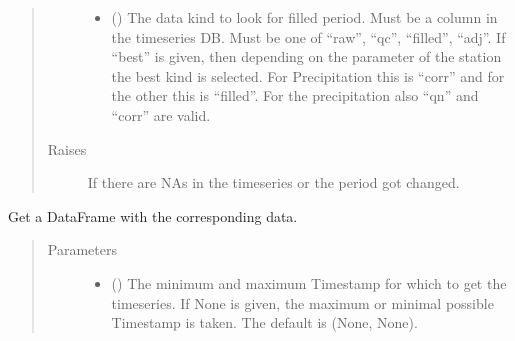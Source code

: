 \documentclass[letterpaper,10pt,english]{sphinxmanual}
\begin{document}
\begin{fulllineitems}
\begin{fulllineitems}
\begin{quote}
\begin{description}
\begin{itemize}
\item {} 
\sphinxAtStartPar
{} () \textendash{} The data kind to look for filled period.
Must be a column in the timeseries DB.
Must be one of “raw”, “qc”, “filled”, “adj”.
If “best” is given, then depending on the parameter of the station the best kind is selected.
For Precipitation this is “corr” and for the other this is “filled”.
For the precipitation also “qn” and “corr” are valid.

\end{itemize}

\item[{Raises}] \leavevmode
\sphinxAtStartPar
{} \textendash{} If there are NAs in the timeseries or the period got changed.

\end{description}\end{quote}

\end{fulllineitems}


\begin{fulllineitems}
\label{\detokenize{weatherDB:weatherDB.station.GroupStation.get_df}}
\sphinxAtStartPar
Get a DataFrame with the corresponding data.
\begin{quote}\begin{description}
\item[{Parameters}] \leavevmode\begin{itemize}
\item {} 
\sphinxAtStartPar
{} ({\hyperref[\detokenize{weatherDB.lib:weatherDB.lib.utils.TimestampPeriod}]{}}\sphinxstyleliteralemphasis{\sphinxupquote{(}}\sphinxstyleliteralemphasis{\sphinxupquote{)}}\sphinxstyleliteralemphasis{\sphinxupquote{, }}) \textendash{} The minimum and maximum Timestamp for which to get the timeseries.
If None is given, the maximum or minimal possible Timestamp is taken.
The default is (None, None).


\end{itemize}
\end{description}
\end{quote}
\end{fulllineitems}
\end{fulllineitems}
\end{document}
